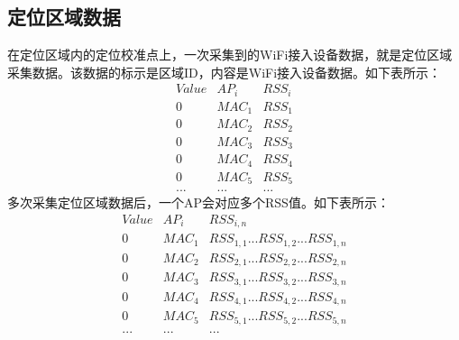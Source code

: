 \documentclass[a4paper, UTF8]{ctexart}
\begin{document}
\subsection{定位区域数据}
在定位区域内的定位校准点上，一次采集到的WiFi接入设备数据，就是定位区域采集数据。该数据的标示是区域ID，内容是WiFi接入设备数据。如下表所示：
\begin{equation}
  \begin{array}{c|c|c}
    Value & AP_{i} & RSS_{i}\\
    \hline
    0 & MAC_{1} & RSS_{1}\\
    0 & MAC_{2} & RSS_{2}\\
    0 & MAC_{3} & RSS_{3}\\
    0 & MAC_{4} & RSS_{4}\\
    0 & MAC_{5} & RSS_{5}\\
    ... & ... & ...
  \end{array}
\end{equation}
多次采集定位区域数据后，一个AP会对应多个RSS值。如下表所示：
\begin{equation}
  \begin{array}{c|c|c}
    Value & AP_{i} & RSS_{i,n}\\
    \hline
    0 & MAC_{1} & RSS_{1,1} ... RSS_{1,2} ... RSS_{1,n}\\
    0 & MAC_{2} & RSS_{2,1} ... RSS_{2,2} ... RSS_{2,n}\\
    0 & MAC_{3} & RSS_{3,1} ... RSS_{3,2} ... RSS_{3,n}\\
    0 & MAC_{4} & RSS_{4,1} ... RSS_{4,2} ... RSS_{4,n}\\
    0 & MAC_{5} & RSS_{5,1} ... RSS_{5,2} ... RSS_{5,n}\\
    ... & ... & ...
  \end{array}
\end{equation}
\end{document}
